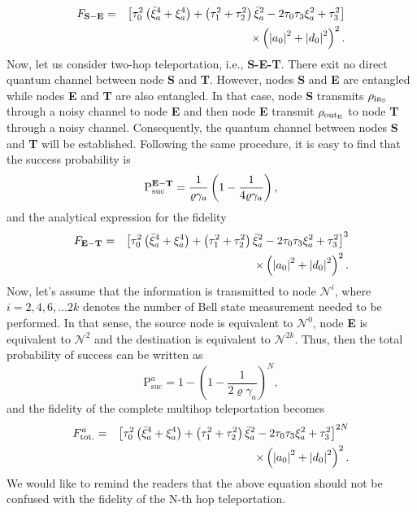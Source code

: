\documentclass[aps,pra,twocolumn,showpacs,superscriptaddress,groupedaddress]{revtex4}
\begin{document}
\begin{eqnarray}
F_{\rm\bf S-E}&=&\left[\tau_0^2\left(\bar{\xi}_a^4+\xi_a^4\right)+\left(\tau_1^2+\tau_2^2\right)\bar{\xi}_a^2-2\tau_0\tau_3\xi_a^2+\tau_3^2\right]\nonumber\\
&&\times\left(\left|a_0\right|^2+\left|d_0\right|^2\right)^2.
\end{eqnarray} 
Now, let us  consider two-hop teleportation, i.e., {\bf S-E-T}. There exit no direct quantum channel between node {\bf S} and {\bf T}. However, nodes {\bf S} and {\bf E} are entangled while nodes  {\bf E} and  {\bf T} are also entangled. In that case, node  {\bf S} transmits $\rho_{\rm in_S}$ through a noisy channel to node {\bf E} and then node  {\bf E} transmit $\rho_{\rm out_E}$ to node {\bf T} through a noisy channel. Consequently, the quantum channel between nodes {\bf S} and {\bf T} will be established. Following the same procedure, it is easy to find that the success probability is
\begin{equation}
\text{P}_{\text{suc}}^{\rm\bf E-T}=\frac{1}{\varrho\gamma_a}\left(1-\frac{1}{4\varrho\gamma_a}\right),
\end{equation}
 and the analytical expression for the fidelity 
\begin{eqnarray}
F_{\rm\bf E-T}&=&\left[\tau_0^2\left(\bar{\xi}_a^4+\xi_a^4\right)+\left(\tau_1^2+\tau_2^2\right)\bar{\xi}_a^2-2\tau_0\tau_3\xi_a^2+\tau_3^2\right]^3\nonumber\\
&&\times\left(\left|a_0\right|^2+\left|d_0\right|^2\right)^2.
\end{eqnarray} 
Now, let's assume that the information is transmitted to node $\mathcal{N}^{i}$, where $i=2,4,6,...2k$ denotes the number of Bell state measurement needed to be performed. In that sense, the source node is equivalent to $\mathcal{N}^{0}$, node {\bf E} is equivalent to  $\mathcal{N}^{2}$ and the destination is equivalent to  $\mathcal{N}^{2k}$.  Thus, then the total probability of success can be written as
\begin{equation}
\text{P}_{\text{suc}}^{a}=1-\left(1-\frac{1}{2\varrho\gamma_a}\right)^{N},\label{EQ6}
\end{equation}
and the fidelity of the complete multihop teleportation becomes
\begin{eqnarray}
F_{\rm tot.}^a&=&\left[\tau_0^2\left(\bar{\xi}_a^4+\xi_a^4\right)+\left(\tau_1^2+\tau_2^2\right)\bar{\xi}_a^2-2\tau_0\tau_3\xi_a^2+\tau_3^2\right]^{2N}\nonumber\\
&&\times\left(\left|a_0\right|^2+\left|d_0\right|^2\right)^2.
\end{eqnarray} 
We would like to remind the readers that the above equation should not be confused with the fidelity of the N-th hop teleportation. 
\end{document}
